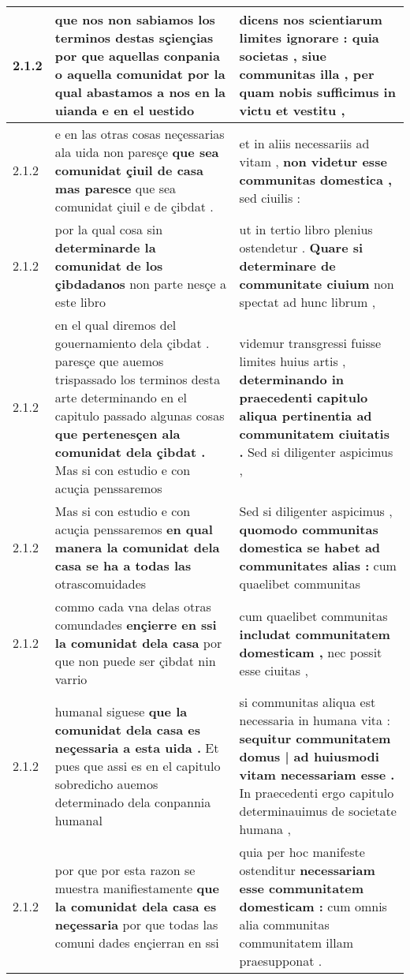 \begin{tabular}{|p{1cm}|p{6.5cm}|p{6.5cm}|}
2.1.2 & que nos non sabiamos los terminos destas sçiençias \textbf{ por que aquellas conpania o aquella comunidat } por la qual abastamos a nos en la uianda e en el uestido & dicens nos scientiarum limites ignorare : \textbf{ quia societas , siue communitas illa , } per quam nobis sufficimus in victu et vestitu , \\\hline
2.1.2 & e en las otras cosas neçessarias ala uida non paresçe \textbf{ que sea comunidat çiuil de casa mas paresce } que sea comunidat çiuil e de çibdat . & et in aliis necessariis ad vitam , \textbf{ non videtur esse communitas domestica , } sed ciuilis : \\\hline
2.1.2 & por la qual cosa sin \textbf{ determinarde la comunidat de los çibdadanos } non parte nesçe a este libro & ut in tertio libro plenius ostendetur . \textbf{ Quare si determinare de communitate ciuium } non spectat ad hunc librum , \\\hline
2.1.2 & en el qual diremos del gouernamiento dela çibdat . paresçe que auemos trispassado los terminos desta arte determinando en el capitulo passado algunas cosas \textbf{ que pertenesçen ala comunidat dela çibdat . } Mas si con estudio e con acuçia penssaremos & videmur transgressi fuisse limites huius artis , \textbf{ determinando in praecedenti capitulo aliqua pertinentia ad communitatem ciuitatis . } Sed si diligenter aspicimus , \\\hline
2.1.2 & Mas si con estudio e con acuçia penssaremos \textbf{ en qual manera la comunidat dela casa se ha a todas las } otrascomuidades & Sed si diligenter aspicimus , \textbf{ quomodo communitas domestica se habet ad communitates alias : } cum quaelibet communitas \\\hline
2.1.2 & commo cada vna delas otras comundades \textbf{ ençierre en ssi la comunidat dela casa } por que non puede ser çibdat nin varrio & cum quaelibet communitas \textbf{ includat communitatem domesticam , } nec possit esse ciuitas , \\\hline
2.1.2 & humanal siguese \textbf{ que la comunidat dela casa es neçessaria a esta uida . } Et pues que assi es en el capitulo sobredicho auemos determinado dela conpannia humanal & si communitas aliqua est necessaria in humana vita : \textbf{ sequitur communitatem domus | ad huiusmodi vitam necessariam esse . } In praecedenti ergo capitulo determinauimus de societate humana , \\\hline
2.1.2 & por que por esta razon se muestra manifiestamente \textbf{ que la comunidat dela casa es neçessaria } por que todas las comuni dades ençierran en ssi & quia per hoc manifeste ostenditur \textbf{ necessariam esse communitatem domesticam : } cum omnis alia communitas communitatem illam praesupponat . \\\hline

\end{tabular}
